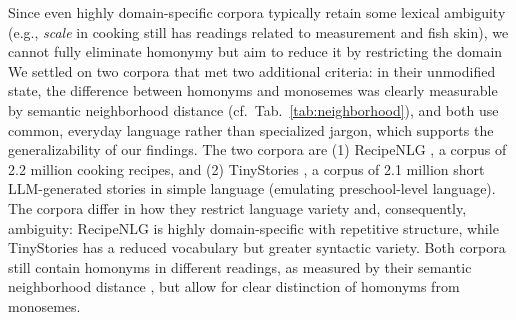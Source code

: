 \documentclass[final]{clv2025}
\begin{document}

Since even highly domain-specific corpora typically retain some lexical ambiguity (e.g., \emph{scale} in cooking still has readings related to measurement and fish skin), we cannot fully eliminate homonymy but aim to reduce it by restricting the domain
We settled on two corpora that met two additional criteria: in their unmodified state, the difference between homonyms and monosemes was clearly measurable by semantic neighborhood distance (cf.\ Tab.~\ref {tab:neighborhood}), and both use common, everyday language rather than specialized jargon, which supports the generalizability of our findings. The two corpora are (1) RecipeNLG \cite{bien-etal-2020-recipenlg}, a corpus of 2.2 million cooking recipes, and (2) TinyStories \cite{eldan2023tinystories}, a corpus of 2.1 million short LLM-generated stories in simple language (emulating preschool-level language). The corpora differ in how they restrict language variety and, consequently, ambiguity: RecipeNLG is highly domain-specific with repetitive structure, while TinyStories has a reduced vocabulary but greater syntactic variety. Both corpora still contain homonyms in different readings, as measured by their semantic neighborhood distance \cite[cf.][]{https://doi.org/10.1111/cogs.12943}, but allow for clear distinction of homonyms from monosemes.
\end{document}
